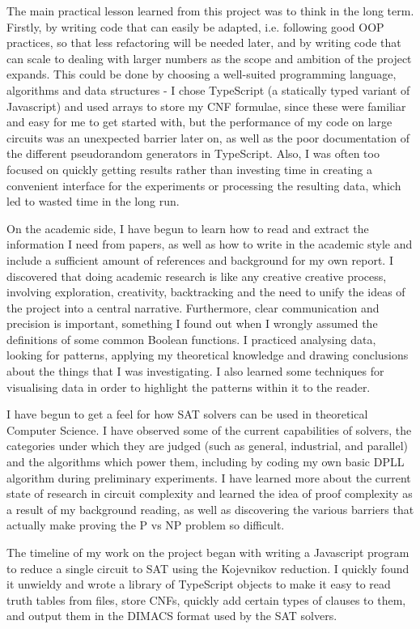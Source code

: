 \documentclass{article}
\begin{document}
The main practical lesson learned from this project was to think in the long term. Firstly, by writing code that can easily be adapted, i.e. following good OOP practices, so that less refactoring will be needed later, and by writing code that can scale to dealing with larger numbers as the scope and ambition of the project expands. This could be done by choosing a well-suited programming language, algorithms and data structures - I chose TypeScript (a statically typed variant of Javascript) and used arrays to store my CNF formulae, since these were familiar and easy for me to get started with, but the performance of my code on large circuits was an unexpected barrier later on, as well as the poor documentation of the different pseudorandom generators in TypeScript. Also, I was often too focused on quickly getting results rather than investing time in creating a convenient interface for the experiments or processing the resulting data, which led to wasted time in the long run.

On the academic side, I have begun to learn how to read and extract the information I need from papers, as well as how to write in the academic style and include a sufficient amount of references and background for my own report. I discovered that doing academic research is like any creative creative process, involving exploration, creativity, backtracking and the need to unify the ideas of the project into a central narrative. Furthermore, clear communication and precision is important, something I found out when I wrongly assumed the definitions of some common Boolean functions. I practiced analysing data, looking for patterns, applying my theoretical knowledge and drawing conclusions about the things that I was investigating. I also learned some techniques for visualising data in order to highlight the patterns within it to the reader.

I have begun to get a feel for how SAT solvers can be used in theoretical Computer Science. I have observed some of the current capabilities of solvers, the categories under which they are judged (such as general, industrial, and parallel) and the algorithms which power them, including by coding my own basic DPLL algorithm during preliminary experiments. I have learned more about the current state of research in circuit complexity and learned the idea of proof complexity as a result of my background reading, as well as discovering the various barriers that actually make proving the P vs NP problem so difficult.

The timeline of my work on the project began with writing a Javascript program to reduce a single circuit to SAT using the Kojevnikov reduction. I quickly found it unwieldy and wrote a library of TypeScript objects to make it easy to read truth tables from files, store CNFs, quickly add certain types of clauses to them, and output them in the DIMACS format used by the SAT solvers. 
\end{document}

